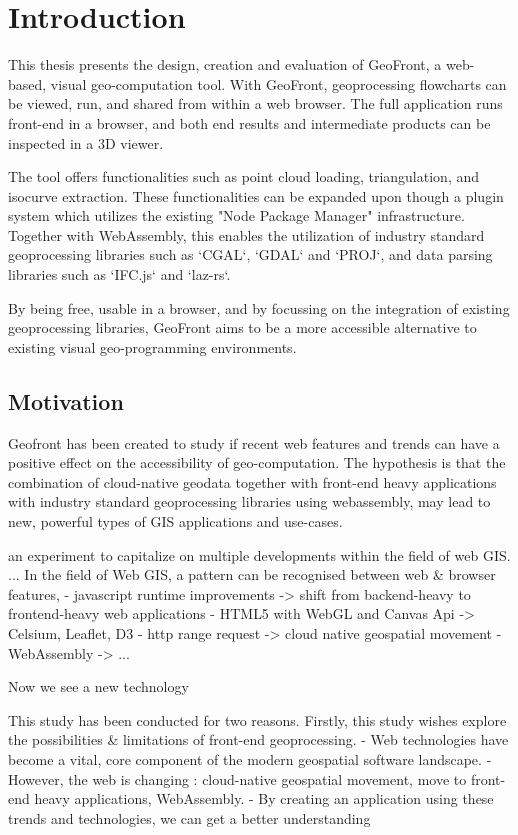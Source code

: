 \chapter{Introduction}
This thesis presents the design, creation and evaluation of GeoFront, a web-based, visual geo-computation tool. 
With GeoFront, geoprocessing flowcharts can be viewed, run, and shared from within a web browser.  
The full application runs front-end in a browser, and both end results and intermediate products can be inspected in a 3D viewer.

The tool offers functionalities such as point cloud loading, triangulation, and isocurve extraction.
These functionalities can be expanded upon though a plugin system which utilizes the existing "Node Package Manager" infrastructure.
Together with WebAssembly, this enables the utilization of industry standard geoprocessing libraries such as `CGAL`, `GDAL` and `PROJ`, and data parsing libraries such as `IFC.js` and `laz-rs`.

By being free, usable in a browser, and by focussing on the integration of existing geoprocessing libraries, GeoFront aims to be a more accessible alternative to existing visual geo-programming environments.

\section{Motivation}
Geofront has been created to study if recent web features and trends can have a positive effect on the accessibility of geo-computation. 
The hypothesis is that the combination of cloud-native geodata together with front-end heavy applications with industry standard geoprocessing libraries using webassembly, may lead to new, powerful types of GIS applications and use-cases. 





an experiment to capitalize on multiple developments within the field of web GIS. 
...
In the field of Web GIS, a pattern can be recognised between web \& browser features,  
- javascript runtime improvements -> shift from backend-heavy to frontend-heavy web applications
- HTML5 with WebGL and Canvas Api -> Celsium, Leaflet, D3
- http range request -> cloud native geospatial movement 
- WebAssembly -> ...

Now we see a new technology 

This study has been conducted for two reasons.
Firstly, this study wishes explore the possibilities \& limitations of front-end geoprocessing.
  - Web technologies have become a vital, core component of the modern geospatial software landscape.
  - However, the web is changing : cloud-native geospatial movement, move to front-end heavy applications, WebAssembly. 
  - By creating an application using these trends and technologies, we can get a better understanding 

